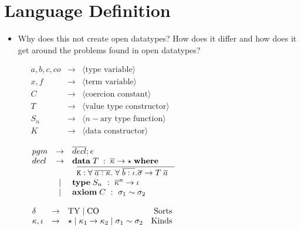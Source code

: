 \section{Language Definition}
\label{sec:langdef}
\begin{itemize}
  \item Why does this not create open datatypes? How does it differ and how
  does it get around the problems found in open datatypes?
\end{itemize}

{\begin{figure}[h]
\vspace{2mm}

$
\begin{array}{lcl}
  a,b,c,co & \to & \langle \textrm{type variable} \rangle \\
  x,f & \to & \langle \textrm{term variable} \rangle \\
  C & \to & \langle \textrm{coercion constant} \rangle \\
  T & \to & \langle \textrm{value type constructor} \rangle \\
  S_n & \to & \langle n-\textrm{ary type function} \rangle \\
  K & \to & \langle \textrm{data constructor} \rangle
\end{array}
$

\vspace{5mm}
\vspace{2mm}

$
\begin{array}{lcl}
  pgm & \to & \overline{decl}; e \\
  decl & \to & \mathbf{data}\;{T\; : \; \overline{\kappa} \to \star \;\mathbf{where}\;} \\
  & & \;\; \overline{{\tt K} : \forall\; \overline{a:\kappa}.\;
  \forall\;\overline{b : \iota}. \overline{\sigma} \to T\; \overline{a}
       \;\;\;}  \\
  & \;|\; & \mathbf{type}\; S_n ~:~ \overline{\kappa}^n \to \iota \\
  & \;|\; & \mathbf{axiom}\; C ~:~ \sigma_1 \sim \sigma_2
\end{array}
$

\vspace{5mm}
\vspace{2mm}

$
\begin{array}{lclr}
  \delta & \to & \textrm{TY} \;|\; \textrm{CO} & \textrm{Sorts} \\
  \kappa, \iota & \to & 
    \star \;|\; \kappa_1 \to \kappa_2 \;|\; \sigma_1 \sim \sigma_2 & \textrm{Kinds}
\end{array}
$


\end{figure}}
